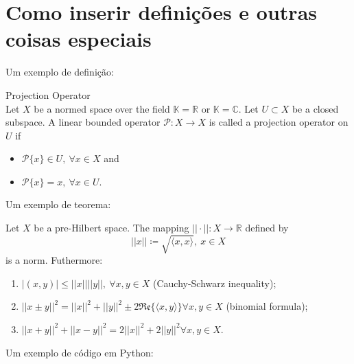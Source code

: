 	\chapter{Como inserir definições e outras coisas especiais}

		Um exemplo de definição:
		\begin{definition}\label{def:3:projection}
			Projection Operator\\
			Let $X$ be a normed space over the field $\mathbb{K}=\mathbb{R}$ or $\mathbb{K}=\mathbb{C}$. Let $U\subset X$ be a closed subspace. A linear bounded operator $\mathcal{P} : X\rightarrow X$ is called a projection operator on $U$ if
			\begin{itemize}
				\item $\mathcal{P}\{x\} \in U, ~\forall x\in X$ and
				\item $\mathcal{P}\{x\} = x,~ \forall x\in U$.
			\end{itemize}
		\end{definition}

		Um exemplo de teorema:
		\begin{theorem}\label{the:app:functional:1}
			Let $X$ be a pre-Hilbert space. The mapping $||\cdot|| : X\rightarrow\mathbb{R}$ defined by $$||x||\coloneqq\sqrt{\langle x,x\rangle},~x\in X$$ is a norm. Futhermore:
			\begin{enumerate}
				\item $|(x,y)|\le||x||||y||,~\forall x,y\in X$ (Cauchy-Schwarz inequality);
				\item $||x\pm y||^2 = ||x||^2+||y||^2\pm 2\mathfrak{Re}\{\langle x,y\rangle\}\forall x,y\in X$ (binomial formula);
				\item  $||x+y||^2 + ||x-y||^2 = 2||x||^2+2||y||^2\forall x,y\in X$.
			\end{enumerate}
		\end{theorem}

		Um exemplo de código em Python:

		

